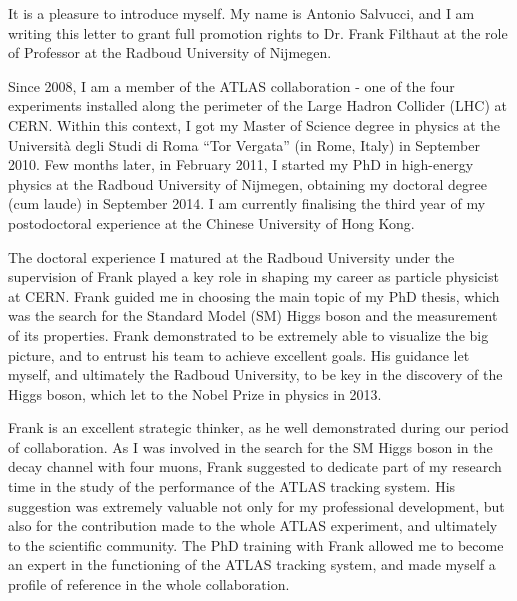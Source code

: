 \documentclass[11pt, a4paper]{\TEXPATH awesome-cv}
\begin{document}
\makecvheader %
\makelettertitle %


\begin{cvletter}
  
  It is a pleasure to introduce myself. My name is Antonio Salvucci, and I am
  writing this letter to grant full promotion rights to Dr. Frank Filthaut at
  the role of Professor at the Radboud University of Nijmegen.

  Since 2008, I am a member of the ATLAS collaboration - one of the four
  experiments installed along the perimeter of the Large Hadron Collider
  (LHC) at CERN. Within this context, I got my Master of Science degree in
  physics at the Universit\`a degli Studi di Roma ``Tor Vergata'' (in Rome,
  Italy) in September 2010. Few months later, in February 2011, I started my
  PhD in high-energy physics at the Radboud University of Nijmegen, obtaining
  my doctoral degree (cum laude) in September 2014. I am currently finalising
  the third year of my postodoctoral experience at the Chinese University of
  Hong Kong.

  The doctoral experience I matured at the Radboud University under the
  supervision of Frank played a key role in shaping my career as particle
  physicist at CERN. Frank guided me in choosing the main topic of my PhD
  thesis, which was the search for the Standard Model (SM) Higgs boson and
  the measurement of its properties. Frank demonstrated to be extremely able
  to visualize the big picture, and to entrust his team to achieve excellent
  goals. His guidance let myself, and ultimately the Radboud University, to
  be key in the discovery of the Higgs boson, which let to the Nobel Prize in
  physics in 2013.

  Frank is an excellent strategic thinker, as he well demonstrated during our
  period of collaboration. As I was involved in the search for the SM Higgs
  boson in the decay channel with four muons, Frank suggested to dedicate
  part of my research time in the study of the performance of the ATLAS
  tracking system. His suggestion was extremely valuable not only for my
  professional development, but also for the contribution made to the whole
  ATLAS experiment, and ultimately to the scientific community. The PhD
  training with Frank allowed me to become an expert in the functioning of
  the ATLAS tracking system, and made myself a profile of reference in the
  whole collaboration.
  

\end{cvletter}
\end{document}
